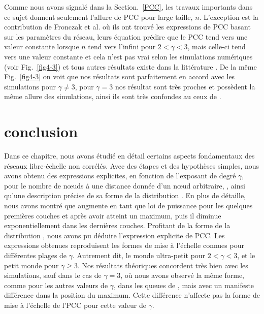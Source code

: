 Comme nous avons signalé dans la Section.~\ref{PCC}, les travaux importants \cite{Do-al2003,Cohen-Havlin2003} dans ce sujet donnent seulement l'allure de PCC pour large taille, $n$. L'exception est la contribution de Fronczak et  al. \cite{Fronczak-al2004} où ils ont trouvé les expressions de PCC basant sur les paramètres du réseau, leurs équation prédire que le PCC tend vers une valeur constante lorsque $n$ tend vers l'infini pour $2<\gamma<3$, mais celle-ci tend vers une valeur constante et cela n’est pas vrai selon les simulations numériques (voir Fig.~\ref{fig4-3}) et tous autres résultats existe dans la littérature \cite{Do-al2003,Cohen-al2002,Chung-Lu2002,Fox-Bellwood2014,Hofstad-al2014,Cohen-Havlin2003}. De la même Fig.~\ref{fig4-3} on voit que nos résultats sont parfaitement en accord avec les simulations pour $\gamma\neq3$, pour $\gamma=3$ nos résultat sont très proches et possèdent la même allure des simulations, ainsi ils sont très confondes au ceux de \cite{Fronczak-al2004}.
 
\section{conclusion} 
Dans ce chapitre, nous avons étudié en détail certains aspects fondamentaux des réseaux libre-échelle non corrélés. Avec des étapes et des hypothèses simples, nous avons obtenu des expressions explicites, en fonction de l'exposant de degré $\gamma$, pour le nombre de nœuds à une distance donnée d'un nœud arbitraire, \nl\nolinebreak, ainsi qu'une description précise de sa forme de la distribution \nolinebreak. En plus de détaille, nous avons montré que \nl augmente en tant que loi de puissance pour les quelques premières couches et après avoir atteint un maximum, puis il diminue exponentiellement dans les dernières couches.
Profitant de la forme de la distribution \nl, nous avons pu déduire l'expression explicite de PCC. Les expressions obtenues reproduisent les formes de mise à l'échelle connues pour différentes plages de $\gamma$. Autrement dit, le monde ultra-petit pour $2<\gamma<3$, et le petit monde pour $\gamma\ge 3$. Nos résultats théoriques concordent très bien avec les simulations, sauf dans le cas de $\gamma=3$, où nous avons observé la même forme, comme pour les autres valeurs de $\gamma$, dans les queues de \nl, mais avec un manifeste différence dans la position du maximum. Cette différence n'affecte pas la forme de mise à l'échelle de l'PCC pour cette valeur de $\gamma$.